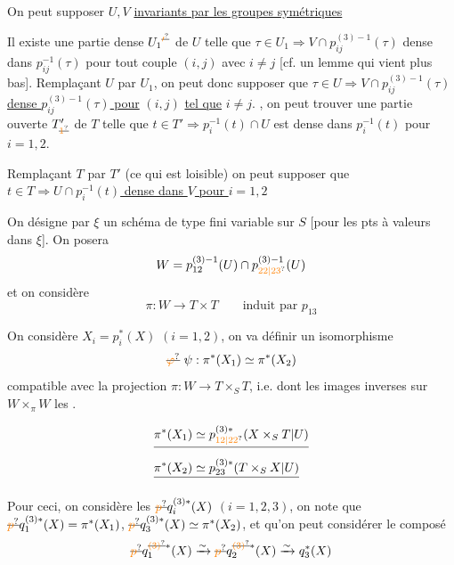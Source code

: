 On peut supposer $U,V$ \uline{invariants par les groupes symétriques}

Il existe une partie  dense $U_{1}{}^{\deleted{\unsure{\prime}}}$ de $U$ telle que $\tau\in U_1\Rightarrow V\cap p_{ij}^{(3)-1}(\tau)$ dense dans $p_{ij}^{-1}(\tau)$ pour tout couple $(i,j)$ avec $i\ne j$ [cf. un lemme qui vient plus bas]. Remplaçant $U$ par $U_1$, on peut donc supposer que \uline{$\tau\in U\Rightarrow V\cap p_{ij}^{(3)-1}(\tau)$ dense  $p_{ij}^{(3)-1}(\tau)$ pour} $(i,j)$ \uline{tel que} $i\ne j$. , on peut trouver une partie ouverte $T'_{\deleted{\unsure{1}}}$ de $T$ telle que $t\in T'\Rightarrow p_i^{-1}(t)\cap U$ est dense dans $p_i^{-1}(t)$ pour $i=1,2$.

Remplaçant $T$ par $T'$ (ce qui est loisible) on peut supposer que \uline{$t\in T\Rightarrow U\cap p_i^{-1}(t)$ dense dans $V$ pour $i=1,2$}


On désigne par $\xi$ un schéma de type fini variable sur $S$ [pour  les pts à valeurs dans $\xi$]. On posera
\[
W=p_{12}^{(3)-1}(U)\cap p_{\unsure{22|23}}^{(3)-1}(U)
\]
et on considère
\[
\pi:W\longrightarrow T\times T\qquad\text{induit par }p_{13}
\]

On considère $X_i=p_i^{*}(X)$ $(i=1,2)$, on va définir un isomorphisme
\[
\deleted{\unsure{\varphi}}\ \psi:\pi^{*}(X_1)\simeq\pi^{*}(X_2)
\]
compatible avec la projection $\pi:W\longrightarrow T\times_S T$, i.e. dont les images inverses sur $W\times_{\pi}W$  les .

\[
\begin{aligned}
&\deleted{\pi^{*}(X_1)\simeq p_{\unsure{12|22}}^{(3)*}(X\times_S T|U)}\\
&\deleted{\pi^{*}(X_2)\simeq p_{23}^{(3)*}(T\times_S X|U)}
\end{aligned}
\]

Pour ceci, on considère les $\deleted{\unsure{p}}q_i^{(3)*}(X)$ $(i=1,2,3)$,
on note que $\deleted{\unsure{p}}q_1^{(3)*}(X)=\pi^{*}(X_1)$, $\deleted{\unsure{p}}q_3^{(3)*}(X)\simeq\pi^{*}(X_2)$, et qu'on peut considérer le composé
\[
\deleted{\unsure{p}}q_1^{\deleted{\unsure{(3)}}*}(X)\xrightarrow{\sim}\deleted{\unsure{p}}q_2^{\deleted{\unsure{(3)}}*}(X)\xrightarrow{\sim}q_3^{*}(X)
\]

